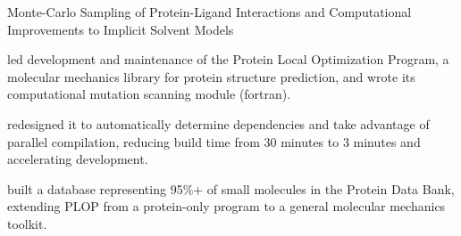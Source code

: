 



 Monte-Carlo Sampling of Protein-Ligand Interactions and Computational Improvements to Implicit Solvent Models\\

\begin{bullets}
    \item {}led development and maintenance of the Protein Local Optimization Program, a molecular mechanics library for protein structure prediction, and wrote its computational mutation scanning module (fortran).
    \item {}redesigned it to automatically determine dependencies and take advantage of parallel compilation, reducing build time from {\mytilde}30 minutes to {\mytilde}3 minutes and accelerating development.
    \item {}built a database representing 95\%+ of small molecules in the Protein Data Bank, extending PLOP from a protein-only program to a general molecular mechanics toolkit.
\end{bullets}


